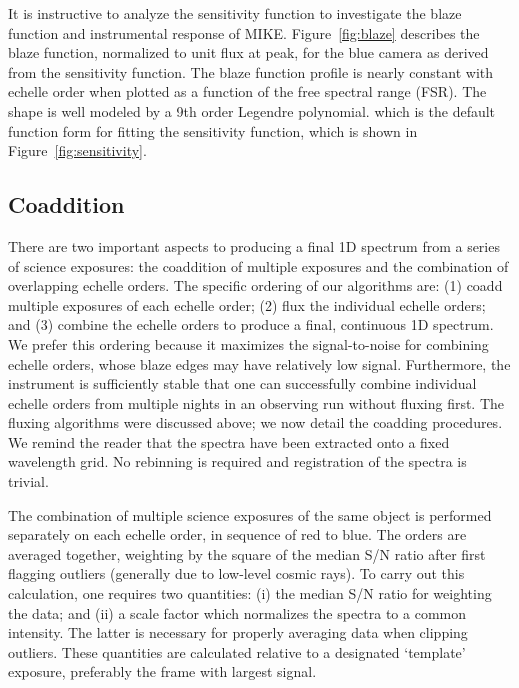 \documentclass[12pt,preprint]{aastex}
\begin{document}
It is instructive to analyze the sensitivity function to 
investigate the blaze function and instrumental response
of MIKE.  Figure~\ref{fig:blaze} describes the blaze function,
normalized to unit flux at peak, for the blue camera as
derived from the sensitivity function.  The blaze function
profile is nearly constant with echelle order when plotted
as a function of the free spectral range (FSR).  The shape
is well modeled by a 9th order Legendre polynomial.
which is the default function form for fitting the sensitivity
function, which is shown in Figure~\ref{fig:sensitivity}.

\subsection{Coaddition}

There are two important aspects to producing a final 1D
spectrum from a series of science exposures:
the coaddition of multiple exposures and the combination
of overlapping echelle orders.
The specific ordering of our algorithms are:
(1) coadd multiple exposures of each echelle order;
(2) flux the individual echelle orders;
and (3) combine the echelle orders to produce a final, continuous
1D spectrum.
We prefer this ordering because it maximizes the signal-to-noise 
for combining echelle orders, whose blaze edges may have relatively
low signal.
Furthermore, the instrument is sufficiently
stable that one can successfully combine individual echelle
orders from multiple nights in an observing run without fluxing first.
The fluxing algorithms were discussed above;
we now detail the coadding procedures.
We remind the reader that the spectra have been extracted onto
a fixed wavelength grid.  No rebinning is required and registration
of the spectra is trivial.

The combination of multiple science exposures of the same object
is performed separately on each echelle order, in sequence of
red to blue.  The orders are averaged together, weighting by the square
of the median S/N ratio after first flagging outliers 
(generally due to low-level cosmic rays).
To carry out this calculation, one requires two quantities:
(i) the median S/N ratio for weighting the data; and
(ii) a scale factor which normalizes the spectra to a common
intensity.  The latter is necessary for properly averaging 
data when clipping outliers.
These quantities are calculated relative to a designated `template' 
exposure, preferably the frame with largest signal.
\end{document}
